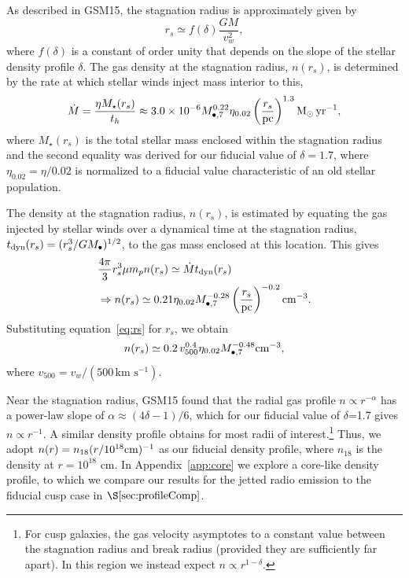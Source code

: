 \documentclass[usenatbib,fleqn]{mnras}
\newcommand{\Mbh}[1][]{M_{\bullet#1}}
\newcommand{\Msun}{{\rm M_\odot}}
\newcommand{\rs}{r_s}
\begin{document}
As described in GSM15, the stagnation radius is approximately given by
\begin{equation}
r_s \simeq f(\delta) \frac{G M}{v_w^2},
\label{eq:rs}
\end{equation}
where $f(\delta)$ is a constant of order unity that depends on the slope of the stellar density profile $\delta$.  The gas density at the stagnation radius, $n(\rs)$, is determined by the rate at which stellar winds inject mass  interior to this,
\begin{equation}
\dot{M}=\frac{\eta M_{\rm \star}(\rs)}{t_h} \approx  3.0 \times 10^{-6} \Mbh[,7]^{0.22} \eta_{0.02} \left(\frac{r_s}{\rm
  pc}\right)^{1.3} \Msun \, {\rm yr}^{-1},
\label{eq:dotM}
\end{equation}
where $M_{\star}(\rs)$ is the total stellar mass enclosed within the stagnation radius and the second equality was derived for our fiducial value of $\delta=1.7$, where $\eta_{0.02}=\eta/0.02$ is normalized to a fiducial value characteristic of an old stellar population.

The density at the stagnation radius, $n(\rs)$, is estimated by equating the gas injected by stellar winds over a dynamical time at the stagnation radius, $t_{\rm dyn} (\rs)=(\rs^3/G \Mbh)^{1/2}$, to the gas mass enclosed at this location.  This gives
\begin{align}
  &\frac{4 \pi}{3} \rs^3 \mu m_p n(r_s) \simeq \dot{M} t_{\rm dyn}
  (\rs) \nonumber\\
  &\Rightarrow n(r_s) \simeq 0.21 \eta_{0.02} \Mbh[,7]^{-0.28} \left(\frac{r_s}{\rm
      pc}\right)^{-0.2} {\rm cm}^{-3}.
\label{eq:nrs}
\end{align}
Substituting equation~\eqref{eq:rs} for $r_s$, we obtain 
\begin{equation}
n(r_s) \simeq 0.2 \, v_{500}^{0.4} \eta_{0.02} \Mbh[,7]^{-0.48} {\rm cm}^{-3},
\label{eq:nrs2}
\end{equation}
where $v_{500}=v_w/\left(500 \,\mathrm{km\,\,
    s^{-1}}\right)$. 

Near the stagnation radius, GSM15 found that the radial gas profile $n \propto r^{-\alpha}$ has a power-law slope of $\alpha \approx (4\delta-1)/6$, which for our fiducial value of $\delta$=1.7 gives $n \propto r^{-1}$.  A similar density profile obtains for most radii of interest.\footnote{For cusp galaxies, the gas velocity asymptotes to a constant value between the stagnation radius and break radius (provided they are
  sufficiently far apart). In this region we instead expect $n\propto r^{1-\delta}$.}  Thus, we adopt $n(r)= n_{18} (r/10^{18} {\rm cm})^{-1}$ as our fiducial density profile, where $n_{18}$ is the density at $r = 10^{18}$ cm.  In Appendix~\ref{app:core} we explore a core-like density profile, to which we compare our results for the jetted radio emission to the fiducial cusp case in $\S\ref{sec:profileComp}$.
\end{document}
